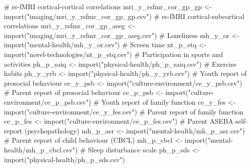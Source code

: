 \documentclass[
  letterpaper,
  DIV=11,
  numbers=noendperiod]{scrreprt}
\newenvironment{Shaded}{\begin{snugshade}}{\end{snugshade}}
\newcommand{\CommentTok}[1]{\textcolor[rgb]{0.37,0.37,0.37}{#1}}
\newcommand{\FunctionTok}[1]{\textcolor[rgb]{0.28,0.35,0.67}{#1}}
\newcommand{\NormalTok}[1]{\textcolor[rgb]{0.00,0.23,0.31}{#1}}
\newcommand{\OtherTok}[1]{\textcolor[rgb]{0.00,0.23,0.31}{#1}}
\newcommand{\StringTok}[1]{\textcolor[rgb]{0.13,0.47,0.30}{#1}}
\begin{document}
\begin{Shaded}
\begin{Highlighting}[]
\CommentTok{\# rs{-}fMRI cortical{-}cortical correlations}
\NormalTok{mri\_y\_rsfmr\_cor\_gp\_gp }\OtherTok{\textless{}{-}} \FunctionTok{import}\NormalTok{(}\StringTok{"imaging/mri\_y\_rsfmr\_cor\_gp\_gp.csv"}\NormalTok{)}
\CommentTok{\# rs{-}fMRI cortical{-}subcortical correlations}
\NormalTok{mri\_y\_rsfmr\_cor\_gp\_aseg }\OtherTok{\textless{}{-}} \FunctionTok{import}\NormalTok{(}\StringTok{"imaging/mri\_y\_rsfmr\_cor\_gp\_aseg.csv"}\NormalTok{)}
\CommentTok{\# Loneliness}
\NormalTok{mh\_y\_or }\OtherTok{\textless{}{-}} \FunctionTok{import}\NormalTok{(}\StringTok{"mental{-}health/mh\_y\_or.csv"}\NormalTok{)}
\CommentTok{\# Screen time}
\NormalTok{nt\_p\_stq }\OtherTok{\textless{}{-}} \FunctionTok{import}\NormalTok{(}\StringTok{"novel{-}technologies/nt\_p\_stq.csv"}\NormalTok{)}
\CommentTok{\# Participation in sports and activities}
\NormalTok{ph\_p\_saiq }\OtherTok{\textless{}{-}} \FunctionTok{import}\NormalTok{(}\StringTok{"physical{-}health/ph\_p\_saiq.csv"}\NormalTok{)}
\CommentTok{\# Exercise habits}
\NormalTok{ph\_y\_yrb }\OtherTok{\textless{}{-}} \FunctionTok{import}\NormalTok{(}\StringTok{"physical{-}health/ph\_y\_yrb.csv"}\NormalTok{)}
\CommentTok{\# Youth report of prosocial behaviour}
\NormalTok{ce\_y\_psb }\OtherTok{\textless{}{-}} \FunctionTok{import}\NormalTok{(}\StringTok{"culture{-}environment/ce\_y\_psb.csv"}\NormalTok{)}
\CommentTok{\# Parent report of prosocial behaviour}
\NormalTok{ce\_p\_psb }\OtherTok{\textless{}{-}} \FunctionTok{import}\NormalTok{(}\StringTok{"culture{-}environment/ce\_p\_psb.csv"}\NormalTok{)}
\CommentTok{\# Youth report of family function}
\NormalTok{ce\_y\_fes }\OtherTok{\textless{}{-}} \FunctionTok{import}\NormalTok{(}\StringTok{"culture{-}environment/ce\_y\_fes.csv"}\NormalTok{)}
\CommentTok{\# Parent report of family function}
\NormalTok{ce\_p\_fes }\OtherTok{\textless{}{-}} \FunctionTok{import}\NormalTok{(}\StringTok{"culture{-}environment/ce\_p\_fes.csv"}\NormalTok{)}
\CommentTok{\# Parent ASEBA self{-}report (psychopathology)}
\NormalTok{mh\_p\_asr }\OtherTok{\textless{}{-}} \FunctionTok{import}\NormalTok{(}\StringTok{"mental{-}health/mh\_p\_asr.csv"}\NormalTok{)}
\CommentTok{\# Parent report of child behaviour (CBCL)}
\NormalTok{mh\_p\_cbcl }\OtherTok{\textless{}{-}} \FunctionTok{import}\NormalTok{(}\StringTok{"mental{-}health/mh\_p\_cbcl.csv"}\NormalTok{)}
\CommentTok{\# Sleep disturbance scale}
\NormalTok{ph\_p\_sds }\OtherTok{\textless{}{-}} \FunctionTok{import}\NormalTok{(}\StringTok{"physical{-}health/ph\_p\_sds.csv"}\NormalTok{)}
\end{Highlighting}
\end{Shaded}
\end{document}

